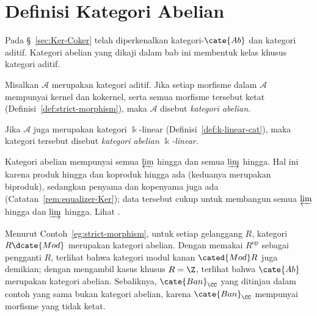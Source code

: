 
\section{Definisi Kategori Abelian}\label{sec:Abel-cat-def}
\hypertarget{o014.aljabr2.chapter2.abelian-category-definition}{ }

Pada \S~\ref{sec:Ker-Coker} telah diperkenalkan kategori-$\cate{Ab}$ dan
kategori aditif. Kategori abelian yang dikaji dalam bab ini membentuk kelas
khusus kategori aditif.

\begin{definisi}
	Misalkan $\mathcal{A}$ merupakan kategori aditif. Jika setiap morfisme dalam
	$\mathcal{A}$ mempunyai kernel dan kokernel, serta semua morfisme tersebut
	ketat (Definisi~\ref{def:strict-morphism}), maka $\mathcal{A}$ disebut
	\emph{kategori abelian}.

	Jika $\mathcal{A}$ juga merupakan kategori $\Bbbk$-linear
	(Definisi~\ref{def:k-linear-cat}), maka kategori tersebut disebut
	\emph{kategori abelian $\Bbbk$-linear}.
\end{definisi}

\begin{catatan}\label{rem:Abel-cat-finite-lim}
	Kategori abelian mempunyai semua $\varprojlim$ hingga dan semua
	$\varinjlim$ hingga. Hal ini karena produk hingga dan koproduk hingga ada
	(keduanya merupakan biproduk), sedangkan penyama dan kopenyama juga ada
	(Catatan~\ref{rem:equalizer-Ker}); data tersebut cukup untuk membangun semua
	$\varprojlim$ hingga dan $\varinjlim$ hingga. Lihat
	\cite[Teorema 2.8.3]{Li1}.
\end{catatan}

Menurut Contoh~\ref{eg:strict-morphism}, untuk setiap gelanggang $R$, kategori
$R\dcate{Mod}$ merupakan kategori abelian. Dengan memakai $R^{\text{op}}$
sebagai pengganti $R$, terlihat bahwa kategori modul kanan $\cated{Mod}R$ juga
demikian; dengan mengambil kasus khusus $R = \Z$, terlihat bahwa $\cate{Ab}$
merupakan kategori abelian. Sebaliknya, $\cate{Ban}_{\CC}$ yang ditinjau dalam
contoh yang sama bukan kategori abelian, karena $\cate{Ban}_{\CC}$ mempunyai
morfisme yang tidak ketat.

